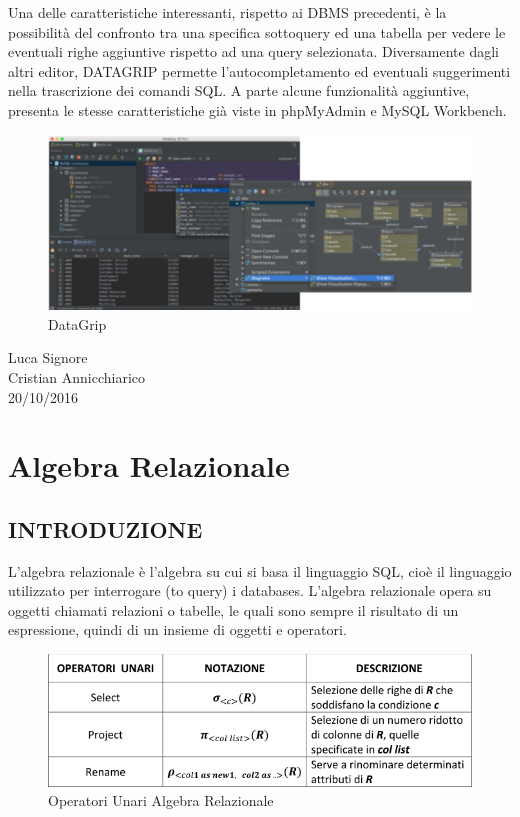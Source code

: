 Una delle caratteristiche interessanti, rispetto ai DBMS precedenti, è la possibilità del confronto tra una specifica sottoquery ed una tabella per vedere le eventuali righe aggiuntive rispetto ad una query selezionata. Diversamente dagli altri editor, DATAGRIP permette l'autocompletamento ed eventuali suggerimenti nella trascrizione dei comandi SQL. A parte alcune funzionalità aggiuntive, presenta le stesse caratteristiche già viste in phpMyAdmin e MySQL Workbench.

\begin{center}
\begin{figure}[H]
\centering
\includegraphics[scale=0.8]{figures/datagrip.png}
\caption{DataGrip} 
\end{figure}
\end{center}


\begin{flushright}Luca Signore\\Cristian Annicchiarico\\20/10/2016\end{flushright}


\section{Algebra Relazionale}

\subsection{INTRODUZIONE}

L’algebra relazionale è l’algebra su cui si basa il linguaggio SQL, cioè il linguaggio utilizzato per interrogare (to query) i databases. L’algebra relazionale opera su oggetti chiamati relazioni o tabelle, le quali sono sempre il risultato di un espressione, quindi di un insieme di oggetti e operatori. 

\begin{center}
\begin{figure}[H]
\centering
\includegraphics[scale=0.8]{figures/relalg.png}
\caption{Operatori Unari Algebra Relazionale} 
\end{figure}
\end{center}

